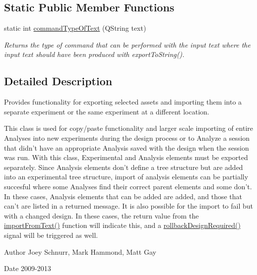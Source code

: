 \subsection*{Static Public Member Functions}
\begin{DoxyCompactItemize}
\item 
static int \hyperlink{class_asset_export_import_a92772031d880cade636d659ca5000d9b}{command\-Type\-Of\-Text} (Q\-String text)
\begin{DoxyCompactList}\small\item\em Returns the type of command that can be performed with the input text where the input text should have been produced with export\-To\-String(). \end{DoxyCompactList}\end{DoxyCompactItemize}


\subsection{Detailed Description}
Provides functionality for exporting selected assets and importing them into a separate experiment or the same experiment at a different location. 

This class is used for copy/paste functionality and larger scale importing of entire Analyses into new experiments during the design process or to Analyze a session that didn't have an appropriate Analysis saved with the design when the session was run. With this class, Experimental and Analysis elements must be exported separately. Since Analysis elements don't define a tree structure but are added into an experimental tree structure, import of analysis elements can be partially succesful where some Analyses find their correct parent elements and some don't. In these cases, Analysis elements that can be added are added, and those that can't are listed in a returned message. It is also possible for the import to fail but with a changed design. In these cases, the return value from the \hyperlink{class_asset_export_import_ac05d9fb6c66ad9a103eaef364f96dd77}{import\-From\-Text()} function will indicate this, and a \hyperlink{class_asset_export_import_ac5e6cc644505281203cb591ccdfe1bca}{rollback\-Design\-Required()} signal will be triggered as well. \begin{DoxyAuthor}{Author}
Joey Schnurr, Mark Hammond, Matt Gay 
\end{DoxyAuthor}
\begin{DoxyDate}{Date}
2009-\/2013 
\end{DoxyDate}


